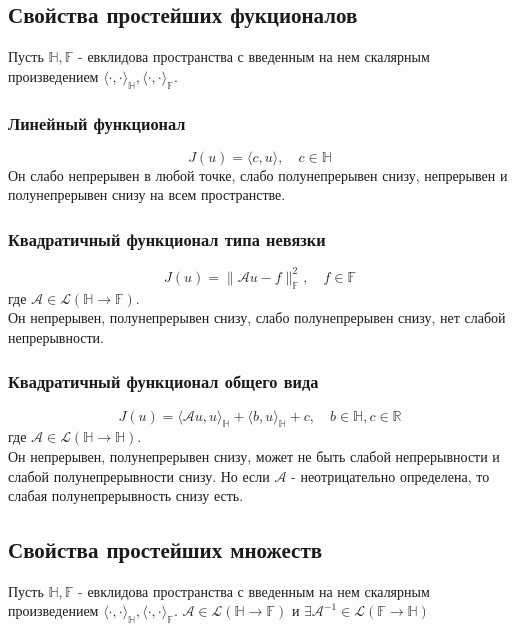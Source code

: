 \documentclass[A4]{article}
\begin{document}
\subsection{Свойства простейших фукционалов}
Пусть $\mathbb{H},\mathbb{F}$ - евклидова пространства с введенным на нем скалярным произведением $\langle\cdot,\cdot\rangle_{\mathbb{H}},\langle\cdot,\cdot\rangle_{\mathbb{F}}$.
\subsubsection{Линейный функционал}
\begin{equation*}
J(u)=\langle c,u\rangle,\quad c\in\mathbb{H}
\end{equation*}
Он слабо непрерывен в любой точке, слабо полунепрерывен снизу, непрерывен и полунепрерывен снизу на всем пространстве.
\subsubsection{Квадратичный функционал типа невязки}
\begin{equation*}
J(u)=\|\mathcal{A}u-f\|^2_{\mathbb{F}},\quad f\in\mathbb{F}
\end{equation*}
где $\mathcal{A}\in\mathcal{L}(\mathbb{H}\rightarrow\mathbb{F})$.\\
Он непрерывен, полунепрерывен снизу, слабо полунепрерывен снизу, нет слабой непрерывности.
\subsubsection{Квадратичный функционал общего вида}
\begin{equation*}
J(u)=\langle\mathcal{A}u,u\rangle_{\mathbb{H}}+\langle b,u\rangle_{\mathbb{H}}+c,\quad b\in\mathbb{H},c\in\mathbb{R}
\end{equation*}
где $\mathcal{A}\in\mathcal{L}(\mathbb{H}\rightarrow\mathbb{H})$.\\
Он непрерывен, полунепрерывен снизу, может не быть слабой непрерывности и слабой полунепрерывности снизу. Но если $\mathcal{A}$ - неотрицательно определена, то слабая полунепрерывность снизу есть.
\subsection{Свойства простейших множеств}
Пусть $\mathbb{H},\mathbb{F}$ - евклидова пространства с введенным на нем скалярным произведением $\langle\cdot,\cdot\rangle_{\mathbb{H}},\langle\cdot,\cdot\rangle_{\mathbb{F}}$. $\mathcal{A}\in\mathcal{L}(\mathbb{H}\rightarrow\mathbb{F})$ и $\exists\mathcal{A}^{-1}\in\mathcal{L}(\mathbb{F}\rightarrow\mathbb{H})$
\end{document}
